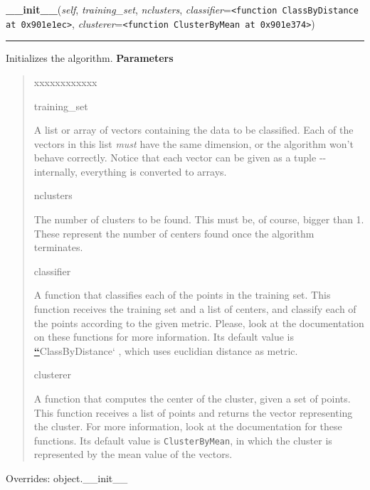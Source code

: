 \hspace{.8\funcindent}\begin{boxedminipage}{\funcwidth}

    \raggedright \textbf{\_\_init\_\_}(\textit{self}, \textit{training\_set}, \textit{nclusters}, \textit{classifier}={\tt {\textless}function ClassByDistance at 0x901e1ec{\textgreater}}, \textit{clusterer}={\tt {\textless}function ClusterByMean at 0x901e374{\textgreater}})

    \vspace{-1.5ex}

    \rule{\textwidth}{0.5\fboxrule}
\setlength{\parskip}{2ex}

Initializes the algorithm.
\setlength{\parskip}{1ex}
      \textbf{Parameters}
      \vspace{-1ex}

      \begin{quote}
        \begin{Ventry}{xxxxxxxxxxxx}

          \item[training\_set]


A list or array of vectors containing the data to be classified.
Each of the vectors in this list \emph{must} have the same dimension, or
the algorithm won't behave correctly. Notice that each vector can be
given as a tuple -{}- internally, everything is converted to arrays.
          \item[nclusters]


The number of clusters to be found. This must be, of course, bigger
than 1. These represent the number of centers found once the
algorithm terminates.
          \item[classifier]


A function that classifies each of the points in the training set.
This function receives the training set and a list of centers, and
classify each of the points according to the given metric. Please,
look at the documentation on these functions for more information.
Its default value is %
\hyperlink{id1}{\textbf{\color{red}``}}ClassByDistance` , which uses euclidian
distance as metric.
          \item[clusterer]


A function that computes the center of the cluster, given a set of
points. This function receives a list of points and returns the
vector representing the cluster. For more information, look at the
documentation for these functions. Its default value is
\texttt{ClusterByMean}, in which the cluster is represented by the mean
value of the vectors.
        \end{Ventry}

      \end{quote}

      Overrides: object.\_\_init\_\_

    \end{boxedminipage}

